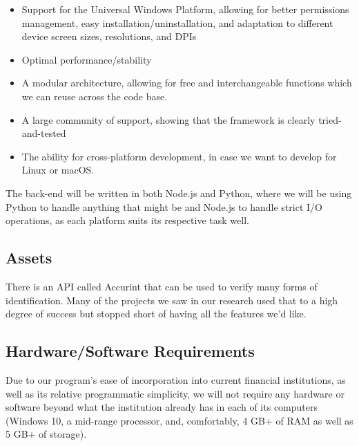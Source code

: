\begin{itemize}
    \item Support for the Universal Windows Platform, allowing for better permissions management, easy installation/uninstallation, and adaptation to different device screen sizes, resolutions, and DPIs
    \item Optimal performance/stability
    \item A modular architecture, allowing for free and interchangeable functions which we can reuse across the code base.
    \item A large community of support, showing that the framework is clearly tried-and-tested
    \item The ability for cross-platform development, in case we want to develop for Linux or macOS.
\end{itemize}

The back-end will be written in both Node.js and Python, where we will be using Python to handle anything that might be and Node.js to handle strict I/O operations, as each platform suits its respective task well.

\subsection{Assets}

There is an API called Accurint that can be used to verify many forms of identification. Many of the projects we saw in our research used that to a high degree of success but stopped short of having all the features we’d like.

\subsection{Hardware/Software Requirements}

Due to our program’s ease of incorporation into current financial institutions, as well as its relative programmatic simplicity, we will not require any hardware or software beyond what the institution already has in each of its computers (Windows 10, a mid-range processor, and, comfortably, 4 GB+ of RAM as well as 5 GB+ of storage).   

\singlespacing